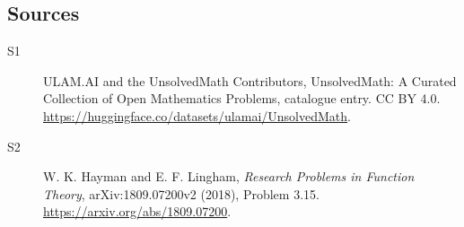 \documentclass[11pt]{article}
\begin{document}
\subsection{Sources}
\begin{description}
\item[\hypertarget{source:statement:1}{S1}] ULAM.AI and the UnsolvedMath Contributors, UnsolvedMath: A Curated Collection of Open Mathematics Problems, catalogue entry. CC BY 4.0. \url{https://huggingface.co/datasets/ulamai/UnsolvedMath}.
\item[\hypertarget{source:statement:2}{S2}] W. K. Hayman and E. F. Lingham, \emph{Research Problems in Function Theory}, arXiv:1809.07200v2 (2018), Problem 3.15. \url{https://arxiv.org/abs/1809.07200}.
\end{description}
\label{end:statement}
\end{document}
